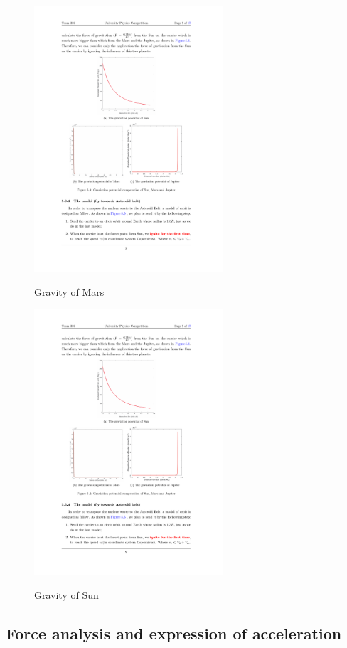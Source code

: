 \documentclass[../Paper.tex]{subfiles}
\begin{document}
\begin{figure}[H]
 \begin{minipage}[t]{0.5\linewidth}
 \centering{}
 \includegraphics[width=7cm]{../Figures/gravmars.pdf}
 \label{fig:orbitlegend}
 \caption{Gravity of Mars}
 \end{minipage}
 \begin{minipage}[t]{0.5\linewidth}
 \centering{}
 \includegraphics[width=7cm]{../Figures/gravsun.pdf}
 \label{fig:orbit1}
\caption{Gravity of Sun} 
 \end{minipage}
\end{figure}

\subsection{Force analysis and expression of acceleration}
\end{document}
